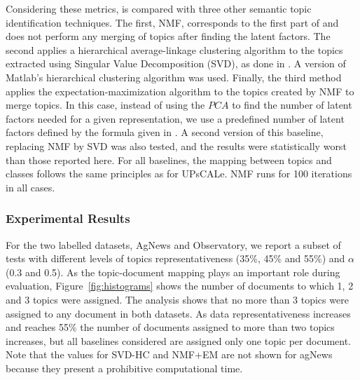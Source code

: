 Considering these metrics, \method is compared with three other semantic topic identification techniques. The first, NMF, corresponds to the first part of \method and does not perform any merging of topics after finding the latent factors. The second applies a hierarchical average-linkage clustering algorithm to the topics extracted using Singular Value Decomposition (SVD), as done in \cite{kuhn2007semantic}. A version of Matlab's hierarchical clustering algorithm was used. Finally, the third method applies the expectation-maximization algorithm %
to the topics created by NMF to merge topics. In this case, instead of using the $PCA$ to find the number of latent factors needed for a given representation, we use a predefined number of latent factors defined by the formula given in \cite{kuhn2007semantic}. A second version of this baseline, replacing NMF by SVD was also tested, and the results were statistically worst than those reported here.
For all baselines, the mapping between topics and classes follows the same principles as for UPsCALe. NMF runs for 100 iterations in all
cases.


\subsubsection{Experimental Results}

For the two labelled datasets, AgNews and Observatory, we report a subset of tests with different levels of topics representativeness (35\%, 45\% and 55\%) and $\alpha$ (0.3 and 0.5). %
As the topic-document mapping plays an important role during evaluation, Figure~\ref{fig:histograms} shows %
the number of documents to which 1, 2 and 3 topics were assigned. The analysis shows that no more than 3 topics were assigned to any document in both datasets. As data representativeness increases and reaches 55\% the number of documents assigned to more than two topics increases, but all baselines considered are assigned only one topic per document. Note that the values for SVD-HC and NMF+EM are not shown for agNews because they present a prohibitive computational time. 


